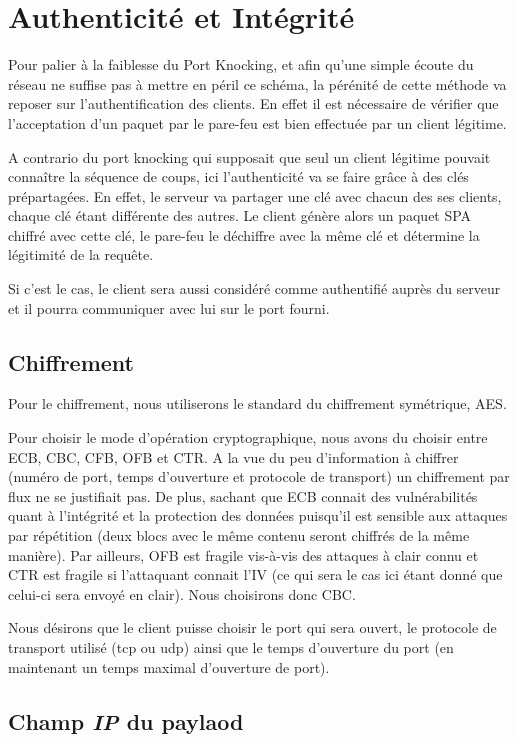 \chapter{Authenticité et Intégrité}

Pour palier à la faiblesse du Port Knocking, et afin qu'une simple écoute du réseau ne suffise pas à mettre en péril ce schéma, la pérénité de cette méthode va reposer sur l'authentification des clients. En effet il est nécessaire de vérifier que l'acceptation d'un paquet par le pare-feu est bien effectuée par un client légitime.

A contrario du port knocking qui supposait que seul un client légitime pouvait connaître la séquence de coups, ici l'authenticité va se faire grâce à des clés prépartagées. En effet, le serveur va partager une clé avec chacun des ses clients, chaque clé étant différente des autres. 
Le client génère alors un paquet SPA chiffré avec cette clé, le pare-feu le déchiffre avec la même clé et détermine la légitimité de la requête.

Si c'est le cas, le client sera aussi considéré comme authentifié auprès du serveur et il pourra communiquer avec lui sur le port fourni.

\section{Chiffrement}
Pour le chiffrement, nous utiliserons le standard du chiffrement symétrique, AES. 

Pour choisir le mode d'opération cryptographique, nous avons du choisir entre ECB, CBC, CFB, OFB et CTR. 
A la vue du peu d'information à chiffrer (numéro de port, temps d'ouverture et protocole de transport) un chiffrement par flux ne se justifiait pas.
De plus, sachant que ECB connait des vulnérabilités quant à l'intégrité et la protection des données puisqu'il est sensible aux attaques par répétition (deux blocs avec le même contenu seront chiffrés de la même manière).
Par ailleurs, OFB est fragile vis-à-vis des attaques à clair connu et CTR est fragile si l'attaquant connait l'IV (ce qui sera le cas ici étant donné que celui-ci sera envoyé en clair).
Nous choisirons donc CBC.


Nous désirons que le client puisse choisir le port qui sera ouvert, le protocole de transport utilisé (tcp ou udp) ainsi que le temps d'ouverture du port (en maintenant un temps maximal d'ouverture de port).

\section{Champ \textbf{\emph{IP}} du paylaod}

